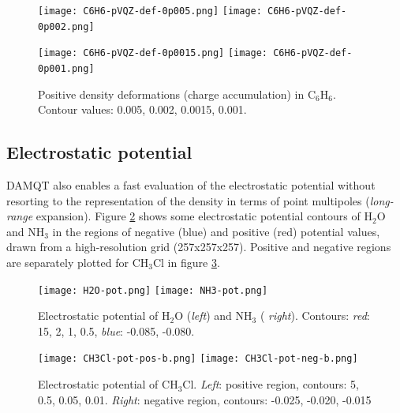 \documentclass[10pt]{article}
\begin{document}
\vspace*{5mm}
\begin{figure}[H]
\begin{center}
\texttt{[image: C6H6-pVQZ-def-0p005.png]}
\hspace*{5mm}
\texttt{[image: C6H6-pVQZ-def-0p002.png]}

\texttt{[image: C6H6-pVQZ-def-0p0015.png]}
\hspace*{5mm}
\texttt{[image: C6H6-pVQZ-def-0p001.png]}
\end{center}
\caption[Charge accumulation in C$_6$H$_6$]{ Positive density deformations (charge accumulation) in C$_6$H$_6$.
Contour values: 0.005, 0.002, 0.0015, 0.001.
\label{fig:6_3_3}}
\end{figure}


\subsection{Electrostatic potential \label{sec:6.4} }

DAMQT also enables a fast evaluation of the electrostatic potential without
resorting to the representation of the density in terms of point multipoles
({\it long-range} expansion). Figure \ref{fig:6_4_1} shows some
electrostatic potential contours of H$_2$O and NH$_3$ in the regions of
negative (blue) and positive (red) potential values, drawn from a high-resolution grid
(257x257x257). Positive and negative regions are separately plotted for
CH$_3$Cl in figure \ref{fig:6_4_2}.


\vspace*{1cm}
\begin{figure}[H]
\begin{center}
\vspace*{-3mm}
\texttt{[image: H2O-pot.png]}
\hspace*{5mm}
\texttt{[image: NH3-pot.png]}
\end{center}
\caption[Electrostatic potential of H$_2$O]{Electrostatic potential of H$_2$O ({\it left}) and NH$_3$ ({\it
right}). Contours: {\it red}: 15, 2, 1, 0.5, {\it blue}: -0.085, -0.080.
\label{fig:6_4_1}}
\end{figure}

\vspace*{5mm}
\begin{figure}[H]
\begin{center}
\vspace*{-3mm}
\texttt{[image: CH3Cl-pot-pos-b.png]}
\hspace*{5mm}
\texttt{[image: CH3Cl-pot-neg-b.png]}
\end{center}
\caption[Electrostatic potential of CH$_3$Cl]{ Electrostatic potential of CH$_3$Cl. 
{\it Left}: positive region, contours: 5, 0.5, 0.05, 0.01. 
{\it Right}: negative region, contours: -0.025, -0.020, -0.015
\label{fig:6_4_2}}
\end{figure}
\end{document}
